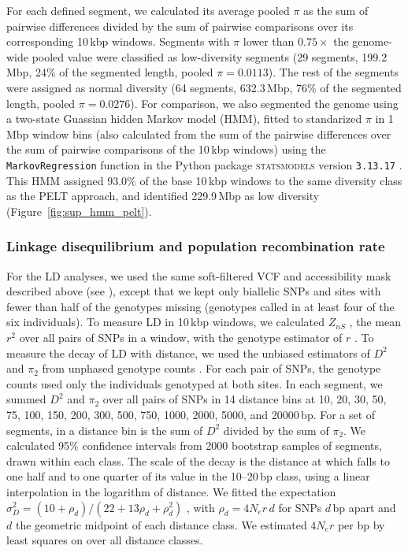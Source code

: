 For each defined segment, we calculated its average pooled $\pi$ as the sum of pairwise
differences divided by the sum of pairwise comparisons over its corresponding 10\,kbp
windows.
Segments with $\pi$ lower than $0.75\times$ the genome-wide pooled value were classified
as low-diversity segments (29 segments, 199.2\,Mbp, 24\% of the segmented length, pooled
$\pi = 0.0113$).
The rest of the segments were assigned as normal diversity (64 segments, 632.3\,Mbp,
76\% of the segmented length, pooled $\pi = 0.0276$).
For comparison, we also segmented the genome using a two-state Guassian hidden Markov
model (HMM), fitted to standarized $\pi$ in 1\,Mbp window bins (also calculated from the
sum of the pairwise differences over the sum of pairwise comparisons of the 10\,kbp
windows) using the \texttt{MarkovRegression} function in the Python package
\textsc{statsmodels} version \texttt{3.13.17} \citep{seabold_2010_statsmodels}.
This HMM assigned 93.0\% of the base 10\,kbp windows to the same diversity class as the
PELT approach, and identified 229.9\,Mbp as low diversity (Figure~\ref{fig:sup_hmm_pelt}).

\subsubsection*{Linkage disequilibrium and population recombination rate}\label{sec:methods_ld}

For the LD analyses, we used the same soft-filtered VCF and
accessibility mask described above (see ), except that we 
kept only biallelic SNPs and sites with fewer than half of the genotypes missing (genotypes
called in at least four of the six individuals).
To measure LD in 10\,kbp windows, we calculated $Z_{nS}$ \citep{kelly_test_1997}, the
mean $r^{2}$ over all pairs of SNPs in a window, with the genotype estimator of $r$
\citep{rogers_linkage_2009}.
To measure the decay of LD with distance, we used the unbiased estimators of $D^{2}$
and $\pi_{2}$ from unphased genotype counts \citep{ragsdale_unbiased_2020}.
For each pair of SNPs, the genotype counts used only the individuals genotyped at both
sites.
In each segment, we summed $D^{2}$ and $\pi_{2}$ over all pairs of SNPs in 14 distance
bins at 10, 20, 30, 50, 75, 100, 150, 200, 300, 500, 750, \num{1000},
\num{2000}, \num{5000}, and \num{20000}\,bp.
For a set of segments, \sdsq{} in a distance bin is the sum of $D^{2}$
divided by the sum of $\pi_{2}$.
We calculated 95\% confidence intervals from \num{2000} bootstrap samples of segments,
drawn within each class.
The scale of the decay is the distance at which \sdsq{} falls to one half and
to one quarter of its value in the 10--20\,bp class, using a linear interpolation in the
logarithm of distance.
We fitted the expectation
$\sigma_{D}^{2} = (10 + \rho_{d}) / (22 + 13\rho_{d} + \rho_{d}^{2})$
\citep{ohta_linkage_1971}, with $\rho_{d} = 4N_{e}r\,d$ for SNPs $d$\,bp apart
and $d$ the geometric midpoint of each distance class.
We estimated $4N_{e}r$ per bp by least squares on \sdsq{} over all distance classes.
\vspace{0.1cm}

